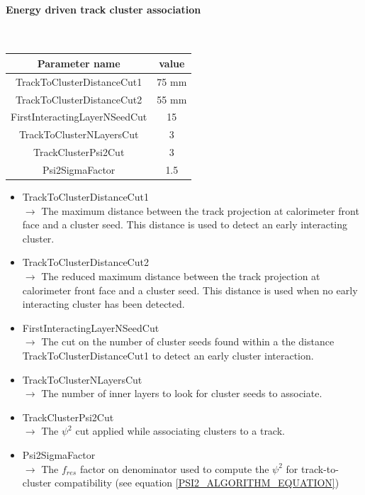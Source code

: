 \documentclass[cits]{JINST}
\begin{document}
\paragraph{Energy driven track cluster association} ~

\begin{table}[!ht]
  \begin{center}
    \begin{tabu} to \linewidth { c | c } 
          Parameter name & value \\
          \hline
          TrackToClusterDistanceCut1 & 75 mm \\
          TrackToClusterDistanceCut2 & 55 mm \\
          FirstInteractingLayerNSeedCut & 15 \\
          TrackToClusterNLayersCut & 3 \\
          TrackClusterPsi2Cut & 3 \\
          Psi2SigmaFactor & 1.5
    \end{tabu} 
  \end{center}
\end{table}

\begin{itemize}
  \item TrackToClusterDistanceCut1 \\
  $\rightarrow$ The maximum distance between the track projection at calorimeter front face and a cluster seed. This distance is used to detect an early interacting cluster.
  \item TrackToClusterDistanceCut2 \\
  $\rightarrow$ The reduced maximum distance between the track projection at calorimeter front face and a cluster seed. This distance is used when no early interacting cluster has been detected.
  \item FirstInteractingLayerNSeedCut \\
  $\rightarrow$ The cut on the number of cluster seeds found within a the distance TrackToClusterDistanceCut1 to detect an early cluster interaction.
  \item TrackToClusterNLayersCut \\
  $\rightarrow$ The number of inner layers to look for cluster seeds to associate.
  \item TrackClusterPsi2Cut \\
  $\rightarrow$ The $\psi^2$ cut applied while associating clusters to a track.
  \item Psi2SigmaFactor \\
  $\rightarrow$ The $f_{res}$ factor on denominator used to compute the $\psi^2$ for track-to-cluster compatibility (see equation \ref{PSI2_ALGORITHM_EQUATION})
\end{itemize}
\end{document}
